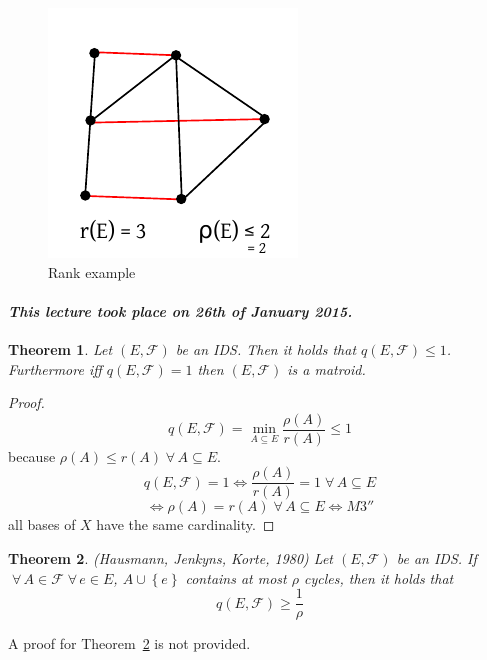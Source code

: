 \documentclass{article}
\newtheorem{theorem}{Theorem}
\newcommand{\set}[1]{\left\{#1\right\}}
\newcommand{\dateref}[1]{\paragraph{\textit{This lecture took place on #1.}}}
\newcommand{\fall}{\;\forall\,}
\newcommand{\noproof}[1]{A proof for Theorem~\ref{#1} is not provided.}
\begin{document}
  \begin{figure}[!ht]
    \begin{center}
      \includegraphics{img/rank_example.pdf}
      \caption{Rank example}
    \end{center}
  \end{figure}

\dateref{26th of January 2015}

\begin{theorem}
  \label{proposition-8.3}
  Let $(E, \mathcal{F})$ be an IDS. Then it holds that $q(E, \mathcal{F}) \leq 1$.
  Furthermore iff $q(E, \mathcal{F}) = 1$ then $(E, \mathcal{F})$ is a matroid.
\end{theorem}

\begin{proof}
  \[ q(E, \mathcal{F}) = \min_{A \subseteq E} \frac{\rho(A)}{r(A)} \leq 1 \]
  because $\rho(A) \leq r(A) \fall A \subseteq E$.
  \[ q(E, \mathcal{F}) = 1 \Leftrightarrow \frac{\rho(A)}{r(A)} = 1 \fall A \subseteq E \]
  \[ \Leftrightarrow \rho(A) = r(A) \fall A \subseteq E \Leftrightarrow M3'' \]
  all bases of $X$ have the same cardinality.
\end{proof}

\begin{theorem}
  \label{satz-8.4}
  (Hausmann, Jenkyns, Korte, 1980)
  Let $(E, \mathcal{F})$ be an IDS. If $\fall A \in \mathcal{F} \fall e \in E$,
  $A \cup \set{e}$ contains at most $\rho$ cycles, then it holds that
  \[ q(E, \mathcal{F}) \geq \frac{1}{\rho} \]
\end{theorem}

\noproof{satz-8.4}
\end{document}

